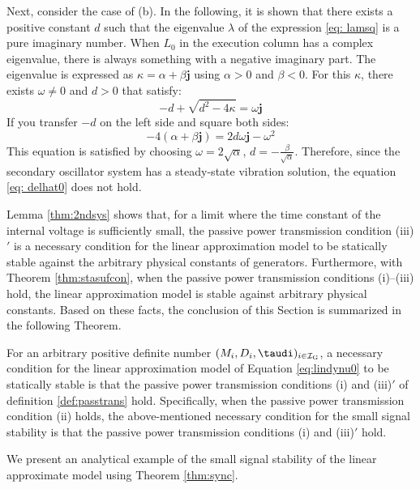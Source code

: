 \documentclass[graybox, envcountchap]{svmult}
\begin{document}
\begin{証明}
Next, consider the case of (b).
In the following, it is shown that there exists a positive constant $ d $ such that the eigenvalue $ \lambda $ of the expression \ref{eq: lamsq} is a pure imaginary number.
When $ L_0 $ in the execution column has a complex eigenvalue, there is always something with a negative imaginary part.
The eigenvalue is expressed as $ \kappa = \alpha + \beta \bm {j} $ using $ \alpha> 0 $ and $ \beta <0 $.
For this $ \kappa $, there exists $ \omega \neq 0 $ and $ d> 0 $ that satisfy: 
\[
-d + \sqrt{d^2-4\kappa}  = \omega \bm{j}
\]
If you transfer $ -d $ on the left side and square both sides:
\[
-4 (\alpha + \beta \bm{j}) = 2d \omega \bm{j} -\omega^2
\]
This equation is satisfied by choosing $ \omega = 2 \sqrt {\alpha} $, $ d =-\tfrac {\beta} {\sqrt {\alpha}} $.
Therefore, since the secondary oscillator system has a steady-state vibration solution, the equation \ref{eq: delhat0} does not hold.
\end{証明}


Lemma \ref{thm:2ndsys} shows that, for a limit where the time constant of the internal voltage is sufficiently small, the passive power transmission condition (iii)$'$ is a necessary condition for the linear approximation model to be statically stable against the arbitrary physical constants of generators.
Furthermore, with Theorem \ref{thm:stasufcon}, when the passive power transmission conditions (i)--(iii) hold, the linear approximation model is stable against arbitrary physical constants.
Based on these facts, the conclusion of this Section is summarized in the following Theorem.


\begin{定理}\label{thm:sync}
For an arbitrary positive definite number $(M_i,D_i,\taudi)_{i \in \mathcal{I}_{\rm G}}$, a necessary condition for the linear approximation model of Equation \ref{eq:lindynu0} to be statically stable is that the passive power transmission conditions (i) and (iii)$'$ of definition \ref{def:passtrans} hold.
Specifically, when the passive power transmission condition (ii) holds, the above-mentioned necessary condition for the small signal stability is that the passive power transmission conditions (i) and (iii)$'$ hold.
\end{定理}

We present an analytical example of the small signal stability of the linear approximate model using Theorem \ref{thm:sync}.
\end{document}
